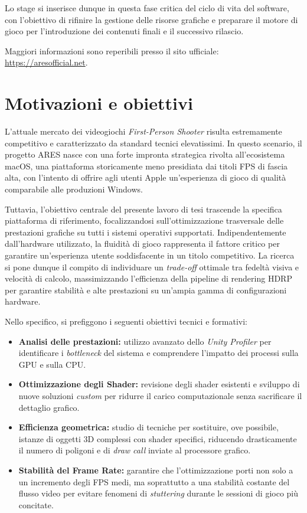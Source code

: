 Lo stage si inserisce dunque in questa fase critica del ciclo di vita del software, con l'obiettivo di rifinire la gestione delle risorse grafiche e preparare il motore di gioco per l'introduzione dei contenuti finali e il successivo rilascio. 

Maggiori informazioni sono reperibili presso il sito ufficiale: \\ \url{https://aresofficial.net}.

\section{Motivazioni e obiettivi}
L'attuale mercato dei videogiochi \textit{First-Person Shooter} risulta estremamente competitivo e caratterizzato da standard tecnici elevatissimi. In questo scenario, il progetto ARES nasce con una forte impronta strategica rivolta all'ecosistema macOS, una piattaforma storicamente meno presidiata dai titoli FPS di fascia alta, con l'intento di offrire agli utenti Apple un'esperienza di gioco di qualità comparabile alle produzioni Windows.

Tuttavia, l'obiettivo centrale del presente lavoro di tesi trascende la specifica piattaforma di riferimento, focalizzandosi sull'ottimizzazione trasversale delle prestazioni grafiche su tutti i sistemi operativi supportati. Indipendentemente dall'hardware utilizzato, la fluidità di gioco rappresenta il fattore critico per garantire un'esperienza utente soddisfacente in un titolo competitivo. La ricerca si pone dunque il compito di individuare un \textit{trade-off} ottimale tra fedeltà visiva e velocità di calcolo, massimizzando l'efficienza della pipeline di rendering HDRP per garantire stabilità e alte prestazioni su un'ampia gamma di configurazioni hardware.

Nello specifico, si prefiggono i seguenti obiettivi tecnici e formativi:
\begin{itemize}
\item \textbf{Analisi delle prestazioni:} utilizzo avanzato dello \textit{Unity Profiler} per identificare i \textit{bottleneck} del sistema e comprendere l'impatto dei processi sulla GPU e sulla CPU.
\item \textbf{Ottimizzazione degli Shader:} revisione degli shader esistenti e sviluppo di nuove soluzioni \textit{custom} per ridurre il carico computazionale senza sacrificare il dettaglio grafico.
\item \textbf{Efficienza geometrica:} studio di tecniche per sostituire, ove possibile, istanze di oggetti 3D complessi con shader specifici, riducendo drasticamente il numero di poligoni e di \textit{draw call} inviate al processore grafico.
\item \textbf{Stabilità del Frame Rate:} garantire che l'ottimizzazione porti non solo a un incremento degli FPS medi, ma soprattutto a una stabilità costante del flusso video per evitare fenomeni di \textit{stuttering} durante le sessioni di gioco più concitate.
\end{itemize}